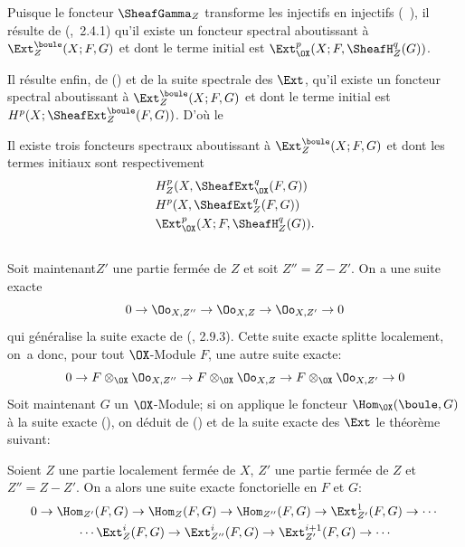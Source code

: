 Puisque le foncteur $\SheafGamma_Z$ transforme les injectifs en injectifs (\sisi{,}{}~), il r\'esulte de (,~2.4.1) qu'il existe un foncteur spectral aboutissant \`a $\Ext_{Z}^\boule(X;F, G)$ et dont le terme initial est $\Ext_{\OX}^p(X;F, \SheafH_Z^q(G))$.

Il r\'esulte enfin, de () et de la suite spectrale des $\Ext$, qu'il existe un foncteur spectral aboutissant \`a $\Ext^{\boule}_Z(X;F, G)$ et dont le terme initial est $H^p(X;\SheafExt_Z^\boule(F, G))$. D'o\`u le

\setcounter{equation}{0}

\begin{theoreme} \label{VI.1.6}
Il existe trois foncteurs spectraux aboutissant \`a $\Ext_{Z}^\boule(X;F, G)$ et dont les termes initiaux sont respectivement
\begin{align}
\label{VI.1.6.1} &H_Z^p(X, \SheafExt_{\OX}^q(F, G))\\
\label{VI.1.6.2} &H^p(X, \SheafExt_Z^q(F, G))\\
\label{VI.1.6.3} &\Ext_{\OX}^p(X;F, \SheafH_Z^q(G)).
\end{align}
\end{theoreme}

\subsection{} \label{VI.1.7}
Soit maintenant\pageoriginale $Z'$ une partie ferm\'ee de $Z$ et soit $Z''=Z {-} Z'$. On a une suite exacte
\setcounter{equation}{0}
\begin{equation} \label{VI.1.7.1}
0 \to \Oo_{X, Z''} \to \Oo_{X, Z} \to \Oo_{X, Z'} \to 0
\end{equation}
qui g\'en\'eralise la suite exacte de (, 2.9.3). Cette suite exacte splitte localement, on~a donc, pour tout $\OX$-Module $F$, une autre suite exacte:
\begin{equation} \label{VI.1.7.2} {0 \to F \otimes_{\OX} \Oo_{X, Z''} \to F \otimes_{\OX} \Oo_{X, Z} \to F \otimes_{\OX} \Oo_{X, Z'} \to 0}
\end{equation}
Soit maintenant $G$ un $\OX$-Module; si on applique le foncteur $\Hom_{\OX}(\boule, G)$ \`a la suite exacte (), on d\'eduit de () et de la suite exacte des $\Ext$ le th\'eor\`eme suivant:

\begin{theoreme} \label{VI.1.8}
Soient $Z$ une partie localement ferm\'ee de $X$, $Z'$ une partie ferm\'ee de $Z$ et $Z''=Z{-} Z'$. On a alors une suite exacte fonctorielle en $F$ et $G$:
\begin{gather*}
0 \to \Hom_{Z'}(F, G) \to \Hom_Z(F, G) \to \Hom_{Z''}(F, G)\to \Ext_{{Z'}}^1(F, G) \to \cdots{}\\
{}\cdots \Ext_{Z}^i(F, G) \to \Ext_{{Z''}}^i(F, G) \to \Ext_{{Z'}}^{i+1}(F, G) \to \cdots{}
\end{gather*}
\end{theoreme}

